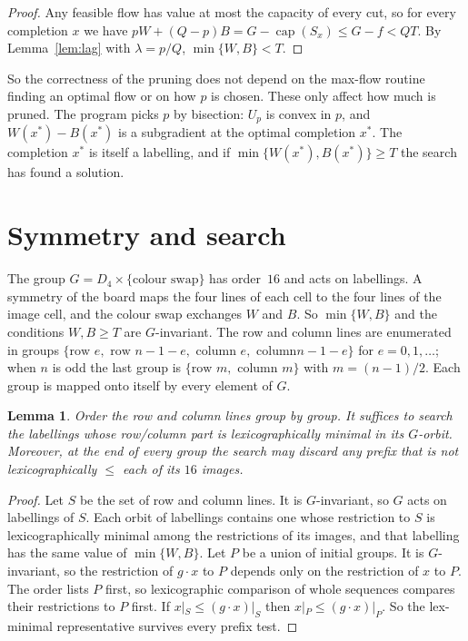\documentclass[11pt]{article}
\newtheorem{lemma}[theorem]{Lemma}
\theoremstyle{remark}
\begin{document}
\begin{proof}
Any feasible flow has value at most the capacity of every cut, so for every completion $x$ we have
$pW+(Q-p)B=G-\operatorname{cap}(S_x)\le G-f<QT$. By Lemma~\ref{lem:lag} with $\lambda=p/Q$,
$\min\{W,B\}<T$.
\end{proof}

So the correctness of the pruning does not depend on the max-flow routine finding an optimal flow or on
how $p$ is chosen. These only affect how much is pruned. The program picks $p$ by bisection: $U_p$ is
convex in $p$, and $W(x^*)-B(x^*)$ is a subgradient at the optimal completion $x^*$. The completion
$x^*$ is itself a labelling, and if $\min\{W(x^*),B(x^*)\}\ge T$ the search has found a solution.

\section{Symmetry and search}

The group $G=D_4\times\{\text{colour swap}\}$ has order~$16$ and acts on labellings. A symmetry of the
board maps the four lines of each cell to the four lines of the image cell, and the colour swap
exchanges $W$ and $B$. So $\min\{W,B\}$ and the conditions $W,B\ge T$ are $G$-invariant. The row and
column lines are enumerated in groups $\{\text{row }e,\text{ row }n-1-e,\text{ column }e,\text{ column
}n-1-e\}$ for $e=0,1,\dots$; when $n$ is odd the last group is $\{\text{row }m,\text{ column }m\}$ with
$m=(n-1)/2$. Each group is mapped onto itself by every element of $G$.

\begin{lemma}\label{lem:sym}
Order the row and column lines group by group. It suffices to search the labellings whose row/column part
is lexicographically minimal in its $G$-orbit. Moreover, at the end of every group the search may
discard any prefix that is not lexicographically $\le$ each of its $16$ images.
\end{lemma}

\begin{proof}
Let $S$ be the set of row and column lines. It is $G$-invariant, so $G$ acts on labellings of $S$. Each
orbit of labellings contains one whose restriction to $S$ is lexicographically minimal among the
restrictions of its images, and that labelling has the same value of $\min\{W,B\}$. Let $P$ be a union of
initial groups. It is $G$-invariant, so the restriction of $g\cdot x$ to $P$ depends only on the
restriction of $x$ to $P$. The order lists $P$ first, so lexicographic comparison of whole sequences
compares their restrictions to $P$ first. If $x|_S\le(g\cdot x)|_S$ then $x|_P\le(g\cdot x)|_P$. So
the lex-minimal representative survives every prefix test.
\end{proof}
\end{document}
